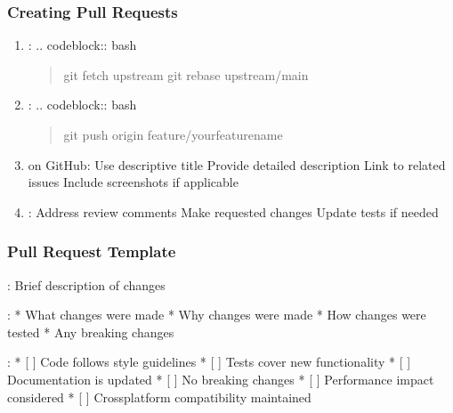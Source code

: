 \documentclass[a4paper,10pt,english,openany,oneside]{sphinxmanual}
\begin{document}
\subsubsection{Creating Pull Requests}
\label{\detokenize{contributing:creating-pull-requests}}\begin{enumerate}
%
\item {} 
\sphinxAtStartPar
{}:
.. code\sphinxhyphen{}block:: bash
\begin{quote}

\sphinxAtStartPar
git fetch upstream
git rebase upstream/main
\end{quote}

\item {} 
\sphinxAtStartPar
{}:
.. code\sphinxhyphen{}block:: bash
\begin{quote}

\sphinxAtStartPar
git push origin feature/your\sphinxhyphen{}feature\sphinxhyphen{}name
\end{quote}

\item {} 
\sphinxAtStartPar
{} on GitHub:
\sphinxhyphen{} Use descriptive title
\sphinxhyphen{} Provide detailed description
\sphinxhyphen{} Link to related issues
\sphinxhyphen{} Include screenshots if applicable

\item {} 
\sphinxAtStartPar
{}:
\sphinxhyphen{} Address review comments
\sphinxhyphen{} Make requested changes
\sphinxhyphen{} Update tests if needed

\end{enumerate}


\subsubsection{Pull Request Template}
\label{\detokenize{contributing:pull-request-template}}
\sphinxAtStartPar
{}: Brief description of changes

\sphinxAtStartPar
{}:
* What changes were made
* Why changes were made
* How changes were tested
* Any breaking changes

\sphinxAtStartPar
{}:
* {[} {]} Code follows style guidelines
* {[} {]} Tests cover new functionality
* {[} {]} Documentation is updated
* {[} {]} No breaking changes
* {[} {]} Performance impact considered
* {[} {]} Cross\sphinxhyphen{}platform compatibility maintained
\end{document}

